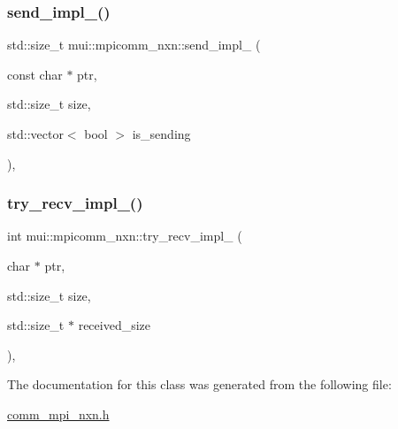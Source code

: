 \subsubsection{\texorpdfstring{send\+\_\+impl\+\_\+()}{send\_impl\_()}}
{\footnotesize\ttfamily std\+::size\+\_\+t mui\+::mpicomm\+\_\+nxn\+::send\+\_\+impl\+\_\+ (\begin{DoxyParamCaption}\item[{const char $\ast$}]{ptr,  }\item[{std\+::size\+\_\+t}]{size,  }\item[{std\+::vector$<$ bool $>$}]{is\+\_\+sending }\end{DoxyParamCaption})\hspace{0.3cm}{\ttfamily [inline]}, {\ttfamily [protected]}}

\mbox{\label{classmui_1_1mpicomm__nxn_afb57050d55372c84325324340e15ac42}} 
\subsubsection{\texorpdfstring{try\+\_\+recv\+\_\+impl\+\_\+()}{try\_recv\_impl\_()}}
{\footnotesize\ttfamily int mui\+::mpicomm\+\_\+nxn\+::try\+\_\+recv\+\_\+impl\+\_\+ (\begin{DoxyParamCaption}\item[{char $\ast$}]{ptr,  }\item[{std\+::size\+\_\+t}]{size,  }\item[{std\+::size\+\_\+t $\ast$}]{received\+\_\+size }\end{DoxyParamCaption})\hspace{0.3cm}{\ttfamily [inline]}, {\ttfamily [protected]}}



The documentation for this class was generated from the following file\+:\begin{DoxyCompactItemize}
\item 
\hyperlink{comm__mpi__nxn_8h}{comm\+\_\+mpi\+\_\+nxn.\+h}\end{DoxyCompactItemize}
